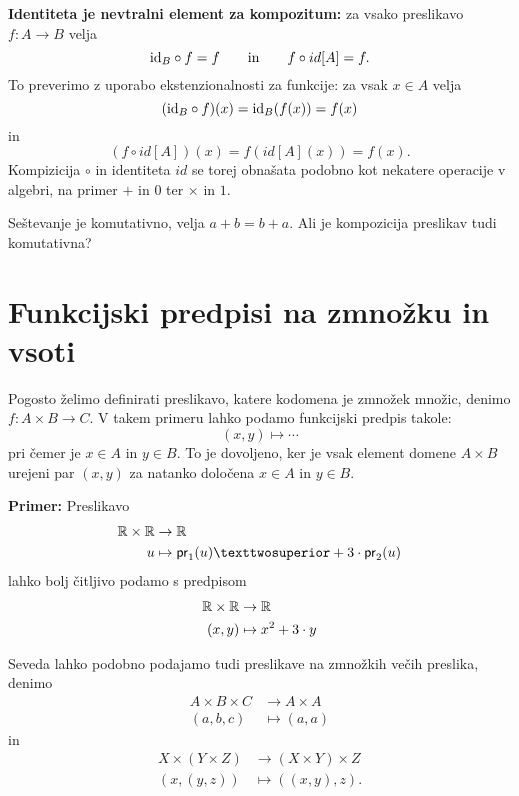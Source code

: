 \textbf{Identiteta je nevtralni element za kompozitum:} za vsako preslikavo $f : A \to B$ velja
%
\begin{equation*}
  \id[B] \circ f = f
  \iinn
  f \circ id[A] = f.
\end{equation*}
%
To preverimo z uporabo ekstenzionalnosti za funkcije: za vsak $x \in A$ velja
%
\begin{equation*}
    (\id[B] \circ f)(x) = \id[B] (f(x)) = f(x)
\end{equation*}
%
in
\begin{equation*}
  (f \circ id[A])(x) = f (id[A](x)) = f(x).
\end{equation*}
%
Kompizicija $\circ$ in identiteta $id$ se torej obnašata podobno kot nekatere operacije v algebri, na primer $+$ in $0$ ter $×$ in $1$.

\begin{naloga}
  Seštevanje je komutativno, velja $a + b = b + a$. Ali je kompozicija preslikav tudi komutativna?
\end{naloga}

\section{Funkcijski predpisi na zmnožku in vsoti}

Pogosto želimo definirati preslikavo, katere kodomena je zmnožek množic, denimo $f : A \times B \to C$. V takem primeru lahko
podamo funkcijski predpis takole:
%
\begin{equation*}
  (x, y) \mapsto \cdots
\end{equation*}
%
pri čemer je $x \in A$ in $y \in B$. To je dovoljeno, ker je vsak element domene $A \times B$ urejeni par $(x, y)$ za natanko določena $x \in A$ in $y \in B$.

\begin{primer}

\textbf{Primer:} Preslikavo
%
\begin{align*}
  \RR \times \RR  &\to  \RR \\
  u &\mapsto  \fst{u}² + 3 \cdot \snd{u}
\end{align*}
%
lahko bolj čitljivo podamo s predpisom
%
\begin{align*}
  \RR \times \RR  &\to  \RR \\
  (x, y) &\mapsto  x^2 + 3 \cdot y
\end{align*}
\end{primer}

\begin{primer}
  Seveda lahko podobno podajamo tudi preslikave na zmnožkih večih preslika, denimo
  \begin{align*}
  A \times B \times C &\to A \times A \\
  (a, b, c) &\mapsto (a, a)
  \end{align*}
  in
  \begin{align*}
  X \times (Y \times Z) &\to (X \times Y) \times Z \\
  (x, (y, z)) &\mapsto ((x, y), z).
  \end{align*}
\end{primer}

